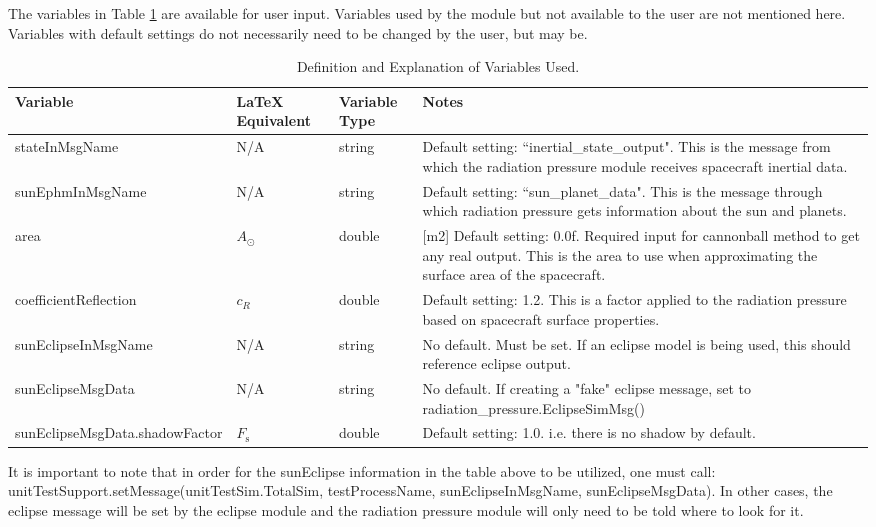 The variables in Table \ref{tabular:vars} are available for user input. Variables used by the module but not available to the user are not mentioned here. Variables with default settings do not necessarily need to be changed by the user, but may be.
\begin{table}[H]
	\caption{Definition and Explanation of Variables Used.}
	\centering \fontsize{10}{10}\selectfont
	\begin{tabular}{ | m{5cm}| m{2cm} | m{1.5cm} | m{6cm} |} %
		\hline
		\textbf{Variable}   		& \textbf{LaTeX Equivalent} 	                  &		\textbf{Variable Type}   & \textbf{Notes} \\ \hline
		stateInMsgName			&N/A		   							    & string 								& Default setting: ``inertial\_state\_output". This is the message from which the radiation pressure module receives spacecraft inertial data.\\ \hline
		sunEphmInMsgName	& N/A 										& string 								& Default setting: ``sun\_planet\_data". This is the message through which radiation pressure gets information about the sun and planets.\\ \hline
		area 						  	  & $A_{\odot}$							  & double 								& [m2] Default setting: 0.0f. Required input for cannonball method to get any real output. This is the area to use when approximating the surface area of the spacecraft.\\ \hline
		coefficientReflection 	  & $c_{R}$ 								& double 								& Default setting: 1.2. This is a factor applied to the radiation pressure based on spacecraft surface properties.\\ \hline
		sunEclipseInMsgName	 & N/A 										 & string									& No default. Must be set. If an eclipse model is being used, this should reference eclipse output. \\ \hline
		sunEclipseMsgData		& N/A										& string									& No default. If creating a "fake" eclipse message, set to radiation\_pressure.EclipseSimMsg() \\ \hline
		sunEclipseMsgData.shadowFactor & $F_{\mathrm{s}}$& double								& Default setting: 1.0. i.e. there is no shadow by default. \\ \hline
	\end{tabular}
	\label{tabular:vars}
\end{table}

It is important to note that in order for the sunEclipse information in the table above to be utilized, one must call:
unitTestSupport.setMessage(unitTestSim.TotalSim, testProcessName, sunEclipseInMsgName, sunEclipseMsgData). In other cases, the eclipse message will be set by the eclipse module and the radiation pressure module will only need to be told where to look for it.

